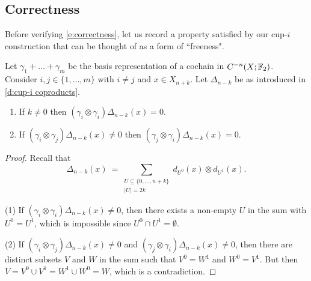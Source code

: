 \subsection{Correctness}

Before verifying \eqref{e:correctness}, let us record a property satisfied by our cup-$i$ construction that can be thought of as a form of ``freeness".

\begin{lemma} \label{l:freeness}
	Let $\gamma_1 + \dots + \gamma_m$ be the basis representation of a cochain in $C^{-n}(X; {\mathbb{F}_2})$.
	Consider $i, j \in \{1, \dots, m\}$ with $i \neq j$ and $x \in X_{n+k}$.
	Let $\Delta_{n-k}$ be as introduced in \cref{d:cup-i coproducts}.
	\begin{enumerate}
		\item If $k \neq 0$ then $(\gamma_i \otimes \gamma_i)\Delta_{n-k}(x) = 0$.
		\item If $(\gamma_i \otimes \gamma_j)\Delta_{n-k}(x) \neq 0$ then $(\gamma_j \otimes \gamma_i)\Delta_{n-k}(x) = 0$.
	\end{enumerate}
\end{lemma}

\begin{proof}
	Recall that
	\begin{equation*}
	\Delta_{n-k}(x) \ = \! \sum_{\substack{U \subseteq \{0, \dots, n+k\} \\ \vert U \vert = 2k}}
	d_{U^0}(x) \otimes d_{U^1}(x).
	\end{equation*}

	(1) If $(\gamma_i \otimes \gamma_i)\Delta_{n-k}(x) \neq 0$, then there exists a non-empty $U$ in the sum with $U^0 = U^1$, which is impossible since $U^0 \cap U^1 = \emptyset$.

	(2) If $(\gamma_i \otimes \gamma_j)\Delta_{n-k}(x) \neq 0$ and $(\gamma_j \otimes \gamma_i)\Delta_{n-k}(x) \neq 0$, then there are distinct subsets $V$ and $W$ in the sum such that $V^0 = W^1$ and $W^0 = V^1$.
	But then $V = V^0 \cup V^1 = W^1 \cup W^0 = W$, which is a contradiction.
\end{proof}

